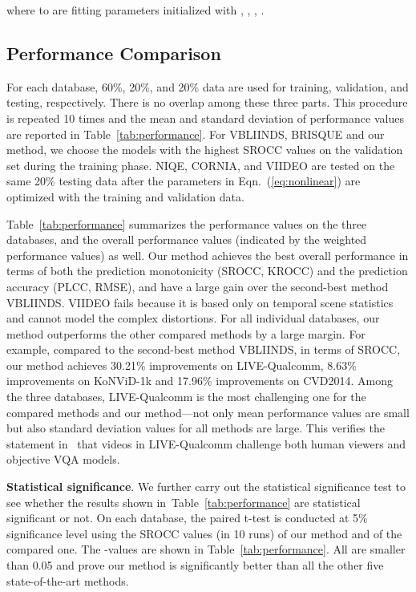 \documentclass[sigconf]{acmart}
\begin{document}
where  to  are fitting parameters initialized with , , , .


\subsection{Performance Comparison}
\label{sec:performance}

For each database, 60\%, 20\%, and 20\% data are used for training, validation, and testing, respectively. There is no overlap among these three parts. This procedure is repeated 10 times and the mean and standard deviation of performance values are reported in Table~\ref{tab:performance}. For VBLIINDS, BRISQUE and our method, we choose the models with the highest SROCC values on the validation set during the training phase. NIQE, CORNIA, and VIIDEO are tested on the same 20\% testing data after the parameters in Eqn.~(\ref{eq:nonlinear}) are optimized with the training and validation data.

Table~\ref{tab:performance} summarizes the performance values on the three databases, and the overall performance values (indicated by the weighted performance values) as well. Our method achieves the best overall performance in terms of both the prediction monotonicity (SROCC, KROCC) and the prediction accuracy (PLCC, RMSE), and have a large gain over the second-best method VBLIINDS. VIIDEO fails because it is based only on temporal scene statistics and cannot model the complex distortions. 
For all individual databases, our method outperforms the other compared methods by a large margin. For example, compared to the second-best method VBLIINDS, in terms of SROCC, our method achieves 30.21\% improvements on LIVE-Qualcomm, 8.63\% improvements on KoNViD-1k and 17.96\% improvements on CVD2014.
Among the three databases, LIVE-Qualcomm is the most challenging one for the compared methods and our method---not only mean performance values are small but also standard deviation values for all methods are large. This verifies the statement in~\cite{ghadiyaram2018capture} that videos in LIVE-Qualcomm challenge both human viewers and objective VQA models.

\textbf{Statistical significance}. We further carry out the statistical significance test to see whether the results shown in~Table~\ref{tab:performance} are statistical significant or not. On each database, the paired t-test is conducted at 5\% significance level using the SROCC values (in 10 runs) of our method and of the compared one. The -values are shown in Table~\ref{tab:performance}. All are smaller than 0.05 and prove our method is significantly better than all the other five state-of-the-art methods.
\end{document}
